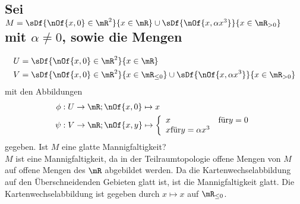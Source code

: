 \subsection{Sei $M = \sDf{\nOf{x,0}\in\mR^2}{x\in\mR}\cup\sDf{\nOf{x,\alpha x^3}}{x\in\mR_{>0}}$ mit $\alpha\neq 0$, sowie die Mengen}
\begin{align}
	U & = \sDf{\nOf{x,0}\in\mR^2}{x\in\mR} \\
	V & = \sDf{\nOf{x,0}\in\mR^2}{x\in\mR_{\leq 0}}\cup\sDf{\nOf{x,\alpha x^3}}{x\in\mR_{>0}}
\end{align}
mit den Abbildungen
\begin{align}
	\phi &: U \to \mR; \nOf{x,0} \mapsto x \\
	\psi &: V \to \mR; \nOf{x,y} \mapsto \left\{\begin{array}{l l}x & \text{für} y = 0\\x \text{für} y = \alpha x^3\end{array}\right.
\end{align}
gegeben. Ist $M$ eine glatte Mannigfaltigkeit?\\
$M$ ist eine Mannigfaltigkeit, da in der Teilraumtopologie offene Mengen von $M$ auf offene Mengen des $\mR$ abgebildet werden.
Da die Kartenwechselabbildung auf den Überschneidenden Gebieten glatt ist, ist die Mannigfaltigkeit glatt. Die Kartenwechselabbildung ist gegeben durch $x\mapsto x$ auf $\mR_{\leq 0}$.